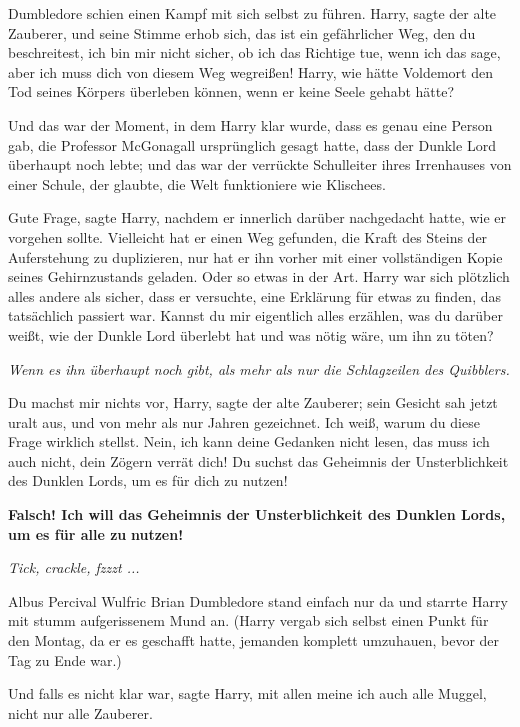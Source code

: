Dumbledore schien einen Kampf mit sich selbst zu führen. \glqq{}Harry\grqq{},
sagte der alte Zauberer, und seine Stimme erhob sich, \glqq{}das ist ein
gefährlicher Weg, den du beschreitest, ich bin mir nicht sicher, ob ich das
Richtige tue, wenn ich das sage, aber ich muss dich von diesem Weg wegreißen!
Harry, wie hätte Voldemort den Tod seines Körpers überleben können, wenn er
keine Seele gehabt hätte?\grqq{}

Und das war der Moment, in dem Harry klar wurde, dass es genau eine Person gab,
die Professor McGonagall ursprünglich gesagt hatte, dass der Dunkle Lord
überhaupt noch lebte; und das war der verrückte Schulleiter ihres Irrenhauses
von einer Schule, der glaubte, die Welt funktioniere wie Klischees.

\glqq{}Gute Frage\grqq{}, sagte Harry, nachdem er innerlich darüber nachgedacht
hatte, wie er vorgehen sollte. \glqq{}Vielleicht hat er einen Weg gefunden, die
Kraft des Steins der Auferstehung zu duplizieren, nur hat er ihn vorher mit
einer vollständigen Kopie seines Gehirnzustands geladen. Oder so etwas in der
Art.\grqq{} Harry war sich plötzlich alles andere als sicher, dass er versuchte,
eine Erklärung für etwas zu finden, das tatsächlich passiert war. \glqq{}Kannst
du mir eigentlich alles erzählen, was du darüber weißt, wie der Dunkle Lord
überlebt hat und was nötig wäre, um ihn zu töten?\grqq{}

\emph{Wenn es ihn überhaupt noch gibt, als mehr als nur die Schlagzeilen des
Quibblers.}

\glqq{}Du machst mir nichts vor, Harry\grqq{}, sagte der alte Zauberer; sein
Gesicht sah jetzt uralt aus, und von mehr als nur Jahren gezeichnet. \glqq{}Ich
weiß, warum du diese Frage wirklich stellst. Nein, ich kann deine Gedanken nicht
lesen, das muss ich auch nicht, dein Zögern verrät dich! Du suchst das Geheimnis
der Unsterblichkeit des Dunklen Lords, um es für dich zu nutzen!\grqq{}

\glqq{}\textbf{Falsch! Ich will das Geheimnis der Unsterblichkeit des Dunklen
Lords, um es für alle zu} \textbf{nutzen!}\grqq{}

\emph{Tick, crackle, fzzzt ...}

Albus Percival Wulfric Brian Dumbledore stand einfach nur da und starrte Harry
mit stumm aufgerissenem Mund an. (Harry vergab sich selbst einen Punkt für den
Montag, da er es geschafft hatte, jemanden komplett umzuhauen, bevor der Tag zu
Ende war.)

\glqq{}Und falls es nicht klar war\grqq{}, sagte Harry, \glqq{}mit allen meine ich
auch alle Muggel, nicht nur alle Zauberer.\grqq{}

